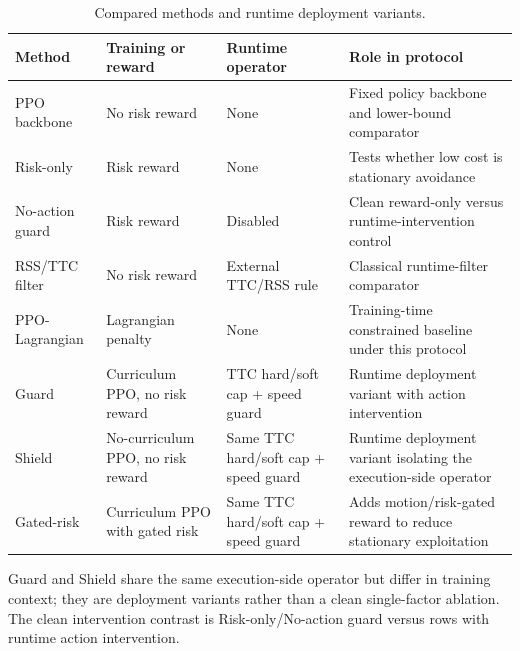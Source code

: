 
\begin{table}[!htbp]
\centering
\caption{Compared methods and runtime deployment variants.}
\label{tab_compared_methods}
\scriptsize
\setlength{\tabcolsep}{3.4pt}
\renewcommand{\arraystretch}{1.08}
\begin{tabular}{@{}>{\raggedright\arraybackslash}p{}>{\raggedright\arraybackslash}p{}>{\raggedright\arraybackslash}p{}>{\raggedright\arraybackslash}p{}@{}}
\toprule
Method & Training or reward & Runtime operator & Role in protocol \\
\midrule
PPO backbone & No risk reward & None & Fixed policy backbone and lower-bound comparator \\
Risk-only & Risk reward & None & Tests whether low cost is stationary avoidance \\
No-action guard & Risk reward & Disabled & Clean reward-only versus runtime-intervention control \\
RSS/TTC filter & No risk reward & External TTC/RSS rule & Classical runtime-filter comparator \\
PPO-Lagrangian & Lagrangian penalty & None & Training-time constrained baseline under this protocol \\
Guard & Curriculum PPO, no risk reward & TTC hard/soft cap + speed guard & Runtime deployment variant with action intervention \\
Shield & No-curriculum PPO, no risk reward & Same TTC hard/soft cap + speed guard & Runtime deployment variant isolating the execution-side operator \\
Gated-risk & Curriculum PPO with gated risk & Same TTC hard/soft cap + speed guard & Adds motion/risk-gated reward to reduce stationary exploitation \\
\bottomrule
\end{tabular}
\begin{tablenotes}
\item Guard and Shield share the same execution-side operator but differ in training context; they are deployment variants rather than a clean single-factor ablation. The clean intervention contrast is Risk-only/No-action guard versus rows with runtime action intervention.
\end{tablenotes}
\end{table}
